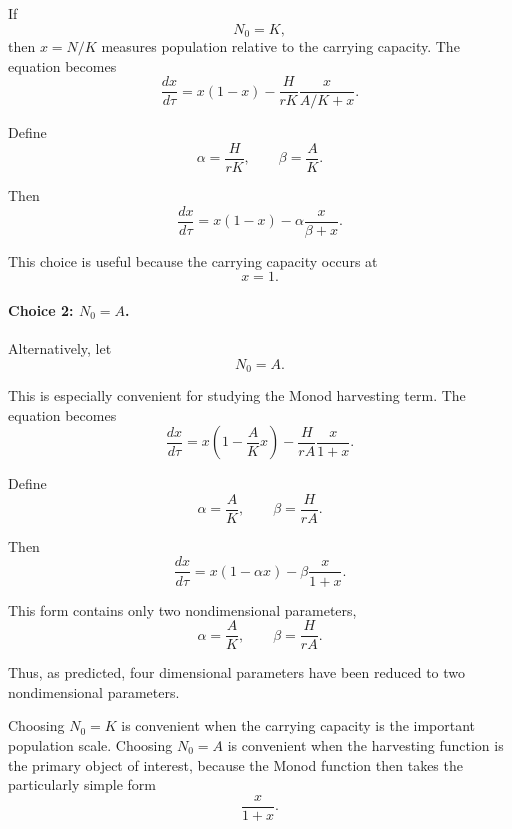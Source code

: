 \documentclass[12pt]{amsart}
\theoremstyle{conjecture}
\theoremstyle{definition}
\theoremstyle{question}
\theoremstyle{theorem}
\begin{document}
\begin{enumerate}[label=(\alph*)]
        If
        \[
            N_0=K,
        \]
        then \(x=N/K\) measures population relative to the carrying capacity.
        The equation becomes
        \[
            \frac{dx}{d\tau}
            =
            x(1-x)
            -
            \frac{H}{rK}
            \frac{x}{A/K+x}.
        \]

        Define
        \[
            \alpha=\frac{H}{rK},
            \qquad
            \beta=\frac{A}{K}.
        \]

        Then
        \[
            \boxed{
                \frac{dx}{d\tau}
                =
                x(1-x)
                -
                \alpha\frac{x}{\beta+x}.
            }
        \]

        This choice is useful because the carrying capacity occurs at
        \[
            x=1.
        \]

        \paragraph{Choice 2: \(N_0=A\).}

        Alternatively, let
        \[
            \boxed{N_0=A}.
        \]

        This is especially convenient for studying the Monod harvesting term.
        The equation becomes
        \[
            \frac{dx}{d\tau}
            =
            x
            \left(
                1-\frac{A}{K}x
            \right)
            -
            \frac{H}{rA}
            \frac{x}{1+x}.
        \]

        Define
        \[
            \alpha=\frac{A}{K},
            \qquad
            \beta=\frac{H}{rA}.
        \]

        Then
        \[
            \boxed{
                \frac{dx}{d\tau}
                =
                x(1-\alpha x)
                -
                \beta\frac{x}{1+x}.
            }
        \]

        This form contains only two nondimensional parameters,
        \[
            \boxed{
                \alpha=\frac{A}{K},
                \qquad
                \beta=\frac{H}{rA}.
            }
        \]

        Thus, as predicted, four dimensional parameters have been reduced to
        two nondimensional parameters.

        Choosing \(N_0=K\) is convenient when the carrying capacity is the
        important population scale. Choosing \(N_0=A\) is convenient when the
        harvesting function is the primary object of interest, because the
        Monod function then takes the particularly simple form
        \[
            \frac{x}{1+x}.
        \]


\end{enumerate}
\end{document}
